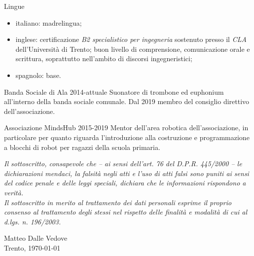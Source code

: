 \documentclass[10pt,a4paper]{report}
\newif\ifcomplete
\begin{document}
    \begin{competence}{Lingue}
        \begin{itemize}
            \item italiano: madrelingua;
            \item inglese: certificazione \textit{B2 specialistico per ingegneria} sostenuto presso il \textit{CLA} dell'Università di Trento; buon livello di comprensione, comunicazione orale e scrittura, soprattutto nell'ambito di discorsi ingegneristici;
            \item spagnolo: base.
        \end{itemize}
    \end{competence}

    \begin{project}
        {Banda Sociale di Ala}
        {2014-attuale}
        Suonatore di trombone ed euphonium all'interno della banda sociale comunale. Dal 2019 membro del consiglio direttivo dell'associazione.
    \end{project}

    \begin{project}
        {Associazione MindsHub}
        {2015-2019}
        Mentor dell'area robotica dell'associazione, in particolare per quanto riguarda l'introduzione alla costruzione e programmazione a blocchi di robot per ragazzi della scuola primaria.
    \end{project}


    \vspace{5mm}

    \noindent
    \textit{Il sottoscritto, consapevole che – ai sensi dell’art. 76 del D.P.R. 445/2000 – le dichiarazioni mendaci, la
    falsità negli atti e l’uso di atti falsi sono puniti ai sensi del codice penale e delle leggi speciali, dichiara che le
    informazioni rispondono a verità. \vspace{2mm} \\
    Il sottoscritto in merito al trattamento dei dati personali esprime il proprio consenso al trattamento degli
    stessi nel rispetto delle finalità e modalità di cui al d.lgs. n. 196/2003.}

    \vspace{4mm}
    \begin{flushright}
        Matteo Dalle Vedove \\
        Trento, \today \\
        \ifcomplete \texttt{[image: signature]} \fi
    \end{flushright}
\end{document}
